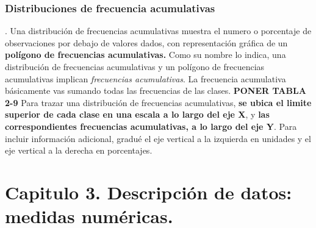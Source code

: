 \documentclass[]{article}
\begin{document}
\subsubsection*{Distribuciones de frecuencia acumulativas}.
Una distribución de frecuencias acumulativas muestra el numero o porcentaje de observaciones por debajo de valores dados, con representación gráfica de un \textbf{polígono de frecuencias acumulativas.} Como su nombre lo indica, una distribución de frecuencias acumulativas y un polígono de frecuencias acumulativas implican \textit{frecuencias acumulativas}. La frecuencia acumulativa básicamente vas sumando todas las frecuencias de las clases. \textbf{PONER TABLA 2-9}
Para trazar una distribución de frecuencias acumulativas, \textbf{se ubica el limite superior de cada clase en una escala a lo largo del eje X}, y \textbf{las correspondientes frecuencias acumulativas, a lo largo del eje Y}. Para incluir información adicional, gradué el eje vertical a la izquierda en unidades y el eje vertical a la derecha en porcentajes.
\section{Capitulo 3. Descripción de datos: medidas numéricas.}
\end{document}

